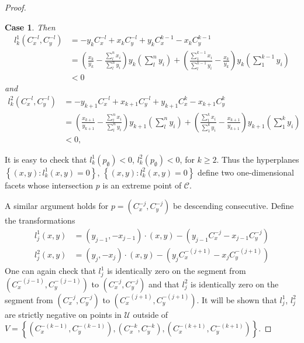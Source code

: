 \documentclass{article}
\theoremstyle{case}
\newtheorem{case}{Case}
\begin{document}
\begin{proof}
\begin{case}
\noindent Then
\begin{align*}
l_k^1\left( C_x^{-l}, C_y^{-l}\right) &= -y_kC_x^{-l} + x_kC_{y}^{-l} + y_kC_x^{k-1} - x_kC_y^{k-1} \\
&= \left( \frac{x_k}{y_k} - \frac{\sum_l^n x_i}{\sum_l^n y_i}\right)y_k \left( \sum_l^n y_i\right) + \left( \frac{\sum_1^{k-1} x_i}{\sum_l^{k-1}y_i} - \frac{x_k}{y_k}\right)y_k \left( \sum_1^{k-1}y_i\right) \\
&< 0
\end{align*}
and
\begin{align*}
l_k^2\left( C_x^{-l}, C_y^{-l}\right) &= -y_{k+1}C_x^{-l} + x_{k+1}C_y^{-l} + y_{k+1}C_x^k - x_{k+1}C_y^k \\
&= \left( \frac{x_{k+1}}{y_{k+1}} - \frac{\sum_l^n x_i}{\sum_l^n y_i}\right)y_{k+1}\left(\sum_l^n y_i\right) + \left( \frac{\sum_1^k x_i}{\sum_1^k y_i} - \frac{x_{k+1}}{y_{k+1}}\right)y_{k+1}\left(\sum_1^k y_i\right) \\
&< 0,
\end{align*}
\end{case}

\noindent It is easy to check that $l_k^1\left( p_{\emptyset}\right) <0$, $l_k^2\left( p_{\emptyset}\right) < 0$, for $k \geq 2$. Thus the hyperplanes $\left\lbrace \left( x,y\right) \colon l_k^1\left( x,y\right) = 0\right\rbrace$, $\left\lbrace \left( x,y\right) \colon l_k^2\left( x,y\right) = 0\right\rbrace$ define two one-dimensional facets whose intersection $p$ is an extreme point of $\mathcal{C}$.

\noindent A similar argument holds for $p = \left( C_x^{-j}, C_y^{-j}\right)$ be descending consecutive. Define the transformations
\begin{align*}
l_j^1\left( x,y\right) &= \left( y_{j-1}, -x_{j-1}\right) \cdot \left( x,y\right) - \left( y_{j-1}C_x^{-j} - x_{j-1}C_y^{-j}\right) \\
l_j^2\left( x,y\right) &= \left( y_j, -x_j\right) \cdot \left( x,y\right) - \left( y_jC_x^{-\left(j+1\right)} - x_jC_y^{-\left( j+1\right)}\right)
\end{align*}
One can again check that $l_j^1$ is identically zero on the segment from $\left( C_x^{-(j-1)}, C_y^{-(j-1)}\right)$ to $\left( C_x^{-j}, C_y^{-j}\right)$ and that $l_j^2$ is identically zero on the segment from  $\left( C_x^{-j}, C_y^{-j}\right)$ to $\left( C_x^{-(j+1)}, C_y^{-(j+1)}\right)$. It will be shown that $l_j^1$, $l_j^2$ are strictly negative on points in $\mathcal{U}$ outside of $V = \left\lbrace (C_x^{-(k-1)}, C_y^{-(k-1)}), (C_x^{-k}, C_y^{-k}), (C_x^{-(k+1)}, C_y^{-(k+1)})\right\rbrace$. 


\end{proof}
\end{document}
